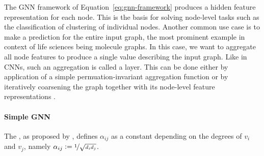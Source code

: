 \documentclass[
	fontsize=10pt, %
	twoside=false, %
	secnumdepth=1, %
  toc=indentunnumbered %
]{kaobook}
\begin{document}
The GNN framework of Equation~\ref{eq:gnn-framework} produces a hidden feature representation
for each node. This is the basis for solving node-level tasks such as the
classification of clustering of individual nodes. Another common use case is to
make a prediction for the entire input graph, the most prominent example in
context of life sciences being molecule graphs. In this case, we want to
aggregate all node features to produce a single value describing the input
graph. Like in CNNs, such an aggregation is called a  layer. This
can be done either by application of a simple permuation-invariant aggregation
function or by iteratively coarsening the graph together with its node-level
feature representations \cite{ying_hierarchical_2019}. 


\paragraph{Simple GNN} The , as
proposed by \citeauthor{kipf_semi-supervised_2017}
\cite{kipf_semi-supervised_2017}, defines $\alpha_{ij}$ as a constant depending
on the degrees of $v_i$ and $v_j$, namely $\alpha_{ij} := \nicefrac{1}{\sqrt{d_i
    d_j}}$.
\end{document}
